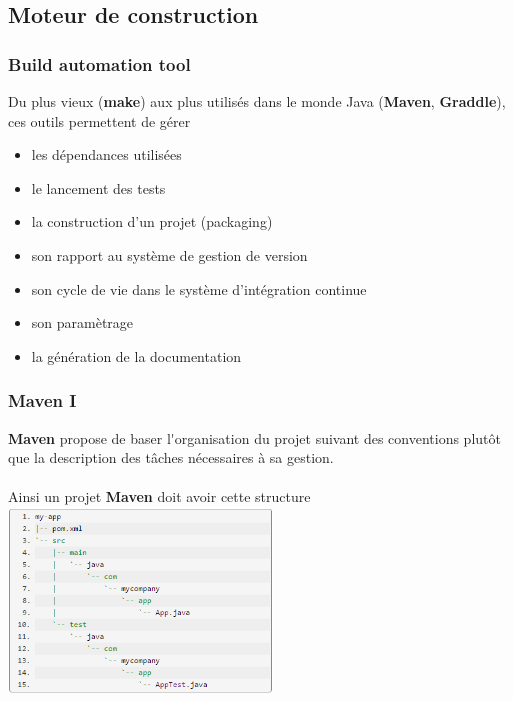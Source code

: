 \subsection{Moteur de construction}
\begin{frame}
	\frametitle{Build automation tool}
Du plus vieux (\textbf{make}) aux plus utilis\'{e}s dans le monde Java (\textbf{Maven}, \textbf{Graddle}), ces outils permettent de g\'{e}rer
~
\begin{itemize}
      \item les d\'{e}pendances utilis\'{e}es
      \item le lancement des tests
      \item la construction d'un projet (packaging)
      \item son rapport au syst\`{e}me de gestion de version
      \item son cycle de vie dans le syst\`{e}me d'int\'{e}gration continue
      \item son param\`{e}trage
      \item la g\'{e}n\'{e}ration de la documentation
    \end{itemize}
\end{frame}

\begin{frame}
	\frametitle{Maven I}
	\textbf{Maven} propose de baser l\'{}organisation du projet suivant des conventions plut\^{o}t que la description des t\^{a}ches n\'{e}cessaires \`{a} sa gestion.
	\\~\\
    Ainsi un projet \textbf{Maven} doit avoir cette structure
    \\
    \includegraphics[width=7cm]{img/maven_structure.png}
\end{frame}

